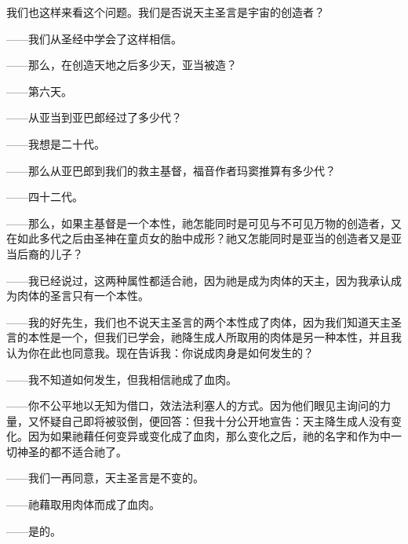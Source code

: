 我们也这样来看这个问题。我们是否说天主圣言是宇宙的创造者？\par

——我们从圣经中学会了这样相信。\par

——那么，在创造天地之后多少天，亚当被造？\par

——第六天。\par

——从亚当到亚巴郎经过了多少代？\par

——我想是二十代。\par

——那么从亚巴郎到我们的救主基督，福音作者玛窦推算有多少代？\par

——四十二代。\par

——那么，如果主基督是一个本性，祂怎能同时是可见与不可见万物的创造者，又在如此多代之后由圣神在童贞女的胎中成形？祂又怎能同时是亚当的创造者又是亚当后裔的儿子？\par

——我已经说过，这两种属性都适合祂，因为祂是成为肉体的天主，因为我承认成为肉体的圣言只有一个本性。\par

——我的好先生，我们也不说天主圣言的两个本性成了肉体，因为我们知道天主圣言的本性是一个，但我们已学会，祂降生成人所取用的肉体是另一种本性，并且我认为你在此也同意我。现在告诉我：你说成肉身是如何发生的？\par

——我不知道如何发生，但我相信祂成了血肉。\par

——你不公平地以无知为借口，效法法利塞人的方式。因为他们眼见主询问的力量，又怀疑自己即将被驳倒，便回答：但我十分公开地宣告：天主降生成人没有变化。因为如果祂藉任何变异或变化成了血肉，那么变化之后，祂的名字和作为中一切神圣的都不适合祂了。\par

——我们一再同意，天主圣言是不变的。\par

——祂藉取用肉体而成了血肉。\par

——是的。\par

